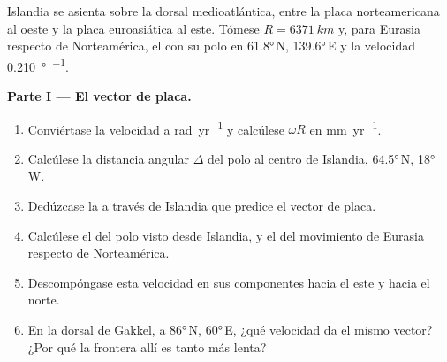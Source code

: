 \begin{problem}
\label{pb:b1:plate-kinematics:1}
Islandia se asienta sobre la dorsal medioatlántica, entre la placa norteamericana al oeste y la placa euroasiática al este. Tómese
$R = \qty{6371}{km}$ y, para Eurasia respecto de Norteamérica, el  con su polo en \ang{61.8}\,N, \ang{139.6}\,E y la
velocidad \qty{0.210}{\degree\per\Myr}.

\medskip
\noindent\textbf{Parte I --- El vector de placa.}
\begin{enumerate}
  \item Conviértase la velocidad a \unit{rad.yr^{-1}} y calcúlese $\omega R$ en
        \unit{mm.yr^{-1}}.
  \item Calcúlese la distancia angular $\Delta$ del polo al centro de Islandia,
        \ang{64.5}\,N, \ang{18}\,W.
  \item Dedúzcase la  a través de Islandia que predice el
        vector de placa.
  \item Calcúlese el  del polo visto desde Islandia, y el  del movimiento
        de Eurasia respecto de Norteamérica.
  \item Descompóngase esta velocidad en sus componentes hacia el este y hacia el norte.
  \item En la dorsal de Gakkel, a \ang{86}\,N, \ang{60}\,E, ¿qué velocidad da el mismo vector? ¿Por qué la frontera allí es tanto más lenta?
\end{enumerate}


\end{problem}
